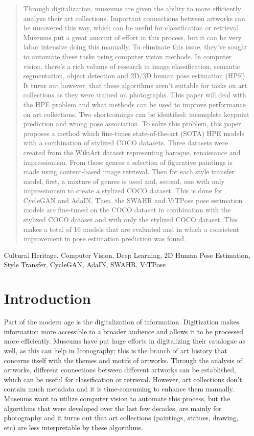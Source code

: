 \documentclass[conference]{IEEEtran}
\begin{document}
\begin{abstract}
Through digitalization, museums are given the ability to more efficiently analyze their art collections.
Important connections between artworks can be uncovered this way, which can be useful for classification or retrieval.
Museums put a great amount of effort in this process, but it can be very labor intensive doing this manually.
To eliminate this issue, they've sought to automate these tasks using computer vision methods.
In computer vision, there's a rich volume of research in image classification, semantic segmentation, object detection and 2D/3D human pose estimation (HPE).
It turns out however, that these algorithms aren't suitable for tasks on art collections as they were trained on photographs.
This paper will deal with the HPE problem and what methods can be used to improve performance on art collections.
Two shortcomings can be identified: incomplete keypoint prediction and wrong pose association.
To solve this problem, this paper proposes a method which fine-tunes state-of-the-art (SOTA) HPE models with a combination of stylized COCO datasets.
Three datasets were created from the WikiArt dataset representing baroque, renaissance and impressionism.
From those genres a selection of figurative paintings is made using content-based image retrieval.
Then for each style transfer model, first, a mixture of genres is used and, second, one with only impressionism to create a stylized COCO dataset.
This is done for CycleGAN and AdaIN.
Then, the SWAHR and ViTPose pose estimation models are fine-tuned on the COCO dataset in combination with the stylized COCO dataset and with only the stylized COCO dataset.
This makes a total of 16 models that are evaluated and in which a consistent improvement in pose estimation prediction was found.
\end{abstract}

\begin{IEEEkeywords}
Cultural Heritage, Computer Vision, Deep Learning, 2D Human Pose Estimation, Style Transfer, CycleGAN, AdaIN, SWAHR, ViTPose
\end{IEEEkeywords}

\section{Introduction}
Part of the modern age is the digitalization of information.
Digitization makes information more accessible to a broader audience and allows it to be processed more efficiently.
Museums have put huge efforts in digitalizing their catalogue as well, as this can help in Iconography; this is the branch of art history that concerns itself with the themes and motifs of artworks.
Through the analysis of artworks, different connections between different artworks can be established, which can be useful for classification or retrieval.
However, art collections don't contain much metadata and it is time-consuming to enhance them manually.
Museums want to utilize computer vision to automate this process, but the algorithms that were developed over the last few decades, are mainly for photography and it turns out that art collections (paintings, statues, drawing, etc) are less interpretable by these algorithms.
\end{document}
